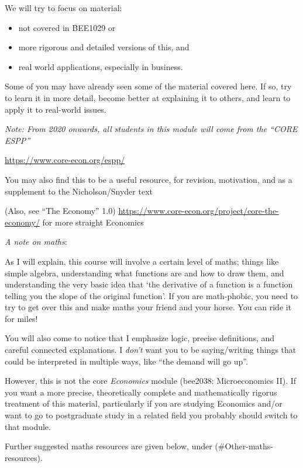 \documentclass[]{article}
\providecommand{\tightlist}{%
  \setlength{\itemsep}{0pt}\setlength{\parskip}{0pt}}
\begin{document}
We will try to focus on material:

\begin{itemize}
\tightlist
\item
  not covered in BEE1029 or
\item
  more rigorous and detailed versions of this, and
\item
  real world applications, especially in business.
\end{itemize}

Some of you may have already seen some of the material covered here.
If so, try to learn it in more detail, become better at explaining it to others, and learn to apply it to real-world issues.

\bigskip

\emph{Note: From 2020 onwards, all students in this module will come from the ``CORE ESPP''}

\url{https://www.core-econ.org/espp/}

You may also find this to be a useful resource, for revision, motivation, and as a supplement to the Nicholson/Snyder text

(Also, see ``The Economy'' 1.0) \url{https://www.core-econ.org/project/core-the-economy/} for more straight Economics

\bigskip

\emph{A note on maths}:

As I will explain, this course will involve a certain level of maths; things like simple algebra, understanding what functions are and how to draw them, and understanding the very basic idea that `the derivative of a function is a function telling you the slope of the original function'. If you are math-phobic, you need to try to get over this and make maths your friend and your horse. You can ride it for miles!

You will also come to notice that I emphasize logic, precise definitions, and careful connected explanations. I \emph{don't} want you to be saying/writing things that could be interpreted in multiple ways, like ``the demand will go up''.

However, this is not the core \emph{Economics} module (bee2038: Microeconomics II). If you want a more precise, theoretically complete and mathematically rigorus treatment of this material, particularly if you are studying Economics and/or want to go to postgraduate study in a related field you probably should switch to that module.

Further suggested maths resources are given below, under (\#Other-maths-resources).
\end{document}
